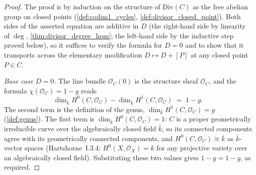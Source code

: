 \begin{proof}

  The proof is by induction on the structure of \(\mathrm{Div}(C)\) as the free
  abelian group on closed points (\cref{def:codim1_cycles},
  \cref{def:divisor_closed_point}). Both sides of the asserted
  equation are additive in \(D\) (the right-hand side by linearity of
  \(\deg\), \cref{thm:divisor_degree_hom}; the left-hand side by the
  inductive step proved below), so it suffices to verify the formula
  for \(D = 0\) and to show that it transports across the elementary
  modification \(D \mapsto D + [P]\) at any closed point \(P \in C\).

  \emph{Base case \(D = 0\).} The line bundle \(\mathcal O_C(0)\) is the
  structure sheaf \(\mathcal O_C\), and the formula
  \(\chi(\mathcal O_C) = 1 - g\) reads
  \[
    \dim_{\bar k} H^0(C, \mathcal O_C)
    - \dim_{\bar k} H^1(C, \mathcal O_C)
    \;=\; 1 - g.
  \]
  The second term is the definition of the genus,
  \(\dim_{\bar k} H^1(C, \mathcal O_C) = g\) (\cref{def:genus}). The
  first term is \(\dim_{\bar k} H^0(C, \mathcal O_C) = 1\): \(C\) is a
  proper geometrically irreducible curve over the algebraically
  closed field \(\bar k\), so its connected components agree with its
  geometrically connected components, and $H^0(C, \mathcal O_C)
  \cong \bar k$ as $\bar k$-vector spaces (Hartshorne~I.3.4: $H^0(X,
  \mathcal O_X) = k$ for any projective variety over an algebraically
  closed field). Substituting these
  two values gives \(1 - g = 1 - g\), as required.


\end{proof}

